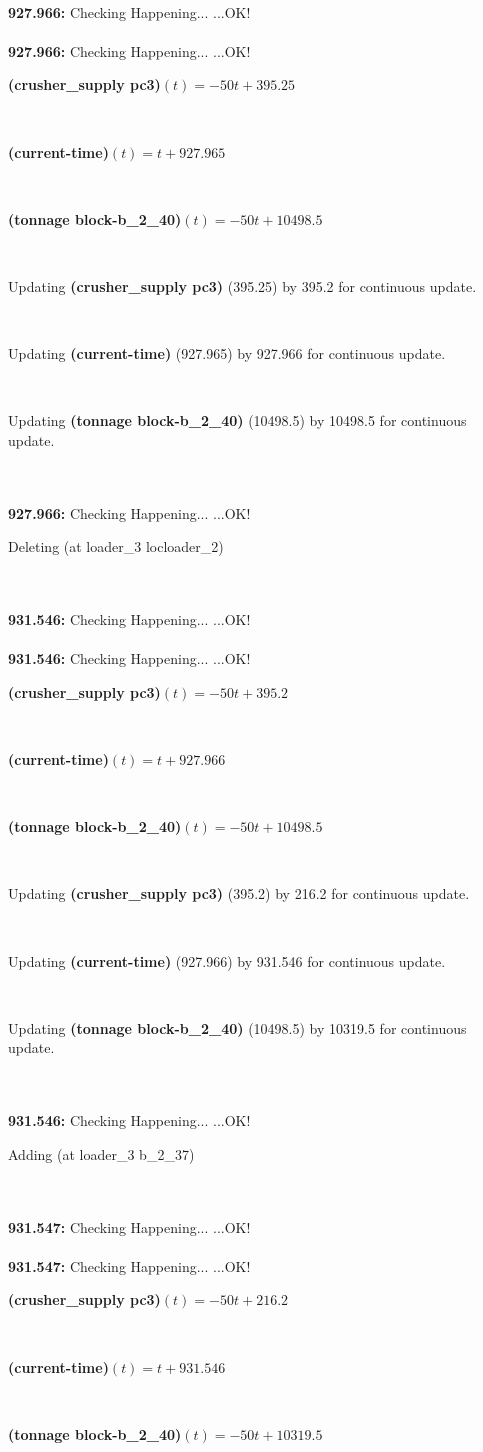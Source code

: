 \documentclass[a4paper,12pt]{article}
\newcommand{\atime}[1]{{\bf #1:}}
\newcommand{\exprn}[1]{{\sf #1}}
\newcommand{\fexprn}[1]{{\small {\bf #1}}}
\newcommand{\checkhappening}{Checking Happening... }
\newcommand{\listrow}[1]{\begin{minipage}[t]{11.5cm} #1 \end{minipage}}
\newcommand{\happeningOK}{...OK!}
\newcommand{\assignmentcts}[3]{\listrow{Updating \fexprn{#1} (#2) by #3 for continuous update.}}
\newcommand{\function}[2]{\listrow{\fexprn{#1}$(t) = #2$}}
\newcommand{\adding}[1]{\listrow{Adding \exprn{#1} }}
\newcommand{\deleting}[1]{\listrow{Deleting \exprn{#1} }}
\begin{document}
\begin{tabbing}
\\
\atime{927.966} \> \checkhappening\happeningOK\\
\\
\atime{927.966} \> \checkhappening\happeningOK\\
 \> \function{(crusher\_supply pc3)}{ - 50t + 395.25}\\
 \> \function{(current-time)}{t + 927.965}\\
 \> \function{(tonnage block-b\_2\_40)}{ - 50t + 10498.5}\\
 \> \assignmentcts{(crusher\_supply pc3)}{395.25}{395.2}\\
 \> \assignmentcts{(current-time)}{927.965}{927.966}\\
 \> \assignmentcts{(tonnage block-b\_2\_40)}{10498.5}{10498.5}\\
\\
\atime{927.966} \> \checkhappening\happeningOK\\
 \> \deleting{(at loader\_3 locloader\_2)}\\
\\
\atime{931.546} \> \checkhappening\happeningOK\\
\\
\atime{931.546} \> \checkhappening\happeningOK\\
 \> \function{(crusher\_supply pc3)}{ - 50t + 395.2}\\
 \> \function{(current-time)}{t + 927.966}\\
 \> \function{(tonnage block-b\_2\_40)}{ - 50t + 10498.5}\\
 \> \assignmentcts{(crusher\_supply pc3)}{395.2}{216.2}\\
 \> \assignmentcts{(current-time)}{927.966}{931.546}\\
 \> \assignmentcts{(tonnage block-b\_2\_40)}{10498.5}{10319.5}\\
\\
\atime{931.546} \> \checkhappening\happeningOK\\
 \> \adding{(at loader\_3 b\_2\_37)}\\
\\
\atime{931.547} \> \checkhappening\happeningOK\\
\\
\atime{931.547} \> \checkhappening\happeningOK\\
 \> \function{(crusher\_supply pc3)}{ - 50t + 216.2}\\
 \> \function{(current-time)}{t + 931.546}\\
 \> \function{(tonnage block-b\_2\_40)}{ - 50t + 10319.5}\\

\end{tabbing}
\end{document}
